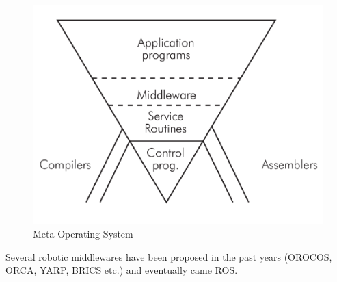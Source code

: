 \begin{figure}[H]
    \centering
    \includegraphics[scale=0.5]{Images/Chapter 1/middleware.png}
    \caption{Meta Operating System}
    \label{fig:metaoperating}
\end{figure}
 
 Several robotic middlewares have been proposed in the past years (OROCOS, ORCA, YARP, BRICS etc.) and eventually came ROS.
 
